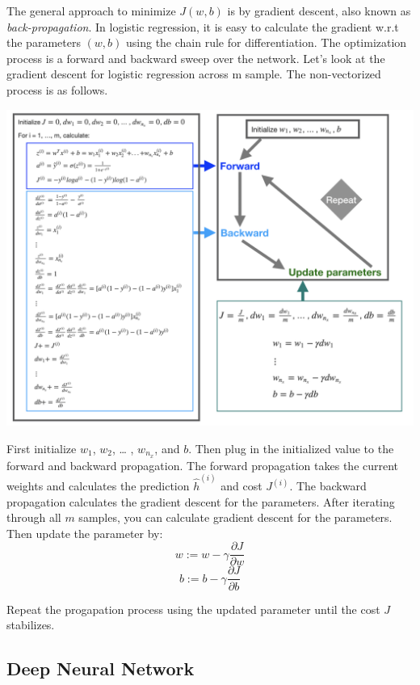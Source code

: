 \documentclass[12pt,]{krantz}
\begin{document}
The general approach to minimize \(J(w,b)\) is by gradient descent, also known as \emph{back-propagation}. In logistic regression, it is easy to calculate the gradient w.r.t the parameters \((w, b)\) using the chain rule for differentiation. The optimization process is a forward and backward sweep over the network. Let's look at the gradient descent for logistic regression across m sample. The non-vectorized process is as follows.

\includegraphics[width=1\textwidth,height=\textheight]{images/GradientDescent.png}

First initialize \(w_1\), \(w_2\), \ldots{} , \(w_{n_x}\), and \(b\). Then plug in the initialized value to the forward and backward propagation. The forward propagation takes the current weights and calculates the prediction \(\hat{h}^{(i)}\) and cost \(J^{(i)}\). The backward propagation calculates the gradient descent for the parameters. After iterating through all \(m\) samples, you can calculate gradient descent for the parameters. Then update the parameter by:
\[w := w - \gamma \frac{\partial J}{\partial w}\]
\[b := b - \gamma \frac{\partial J}{\partial b}\]

Repeat the progapation process using the updated parameter until the cost \(J\) stabilizes.

\hypertarget{deep-neural-network}{%
\subsection{Deep Neural Network}\label{deep-neural-network}}
\end{document}
